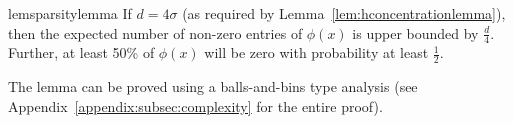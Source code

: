\begin{restatable}{lem}{sparsitylemma}\label{lem:sparsity}
    If $d=4\sigma$ (as required by Lemma~\ref{lem:hconcentrationlemma}), then the expected number of non-zero entries of $\phi(x)$ is upper bounded by $\tfrac{d}{4}$. Further, at least 50\% of $\phi(x)$ will be zero with probability at least $\tfrac{1}{2}$.
\end{restatable}
The lemma can be proved using a balls-and-bins type analysis (see Appendix~\ref{appendix:subsec:complexity} for the entire proof).


